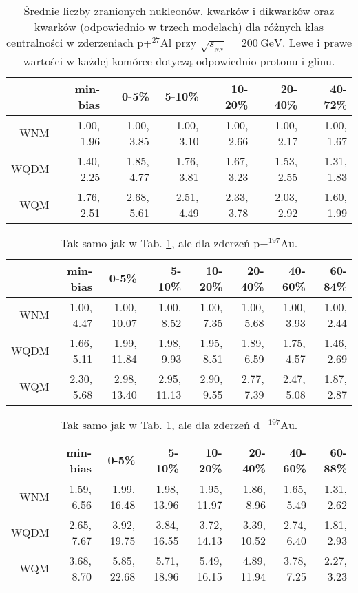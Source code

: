 \documentclass[a4paper,12pt]{article}
\begin{document}
\begin{table}[H]\centering
\begin{tabular}{|r|r|r|r|r|r|r|} \hline
 & min-bias & 0-5\% & 5-10\% & 10-20\% & 20-40\% & 40-72\% \\ \hline
WNM  & 1.00, 1.96 & 1.00, 3.85 & 1.00, 3.10 & 1.00, 2.66 & 1.00, 2.17 & 1.00, 1.67 \\ \hline
WQDM & 1.40, 2.25 & 1.85, 4.77 & 1.76, 3.81 & 1.67, 3.23 & 1.53, 2.55 & 1.31, 1.83 \\ \hline
WQM  & 1.76, 2.51 & 2.68, 5.61 & 2.51, 4.49 & 2.33, 3.78 & 2.03, 2.92 & 1.60, 1.99 \\ \hline
\end{tabular}
\caption{Średnie liczby zranionych nukleonów, kwarków i dikwarków oraz kwarków (odpowiednio w trzech modelach) dla różnych klas centralności w zderzeniach p+$^{27}$Al przy $\sqrt{s_{_{NN}}} = 200~\text{GeV}$. Lewe i prawe wartości w każdej komórce dotyczą odpowiednio protonu i glinu.}\label{table:p-Al}
\end{table}
\begin{table}[H]\centering
\begin{tabular}{|r|r|r|r|r|r|r|r|} \hline
 & min-bias & 0-5\% & 5-10\% & 10-20\% & 20-40\% & 40-60\% & 60-84\% \\ \hline
WNM  & 1.00, 4.47 & 1.00, 10.07 & 1.00, 8.52 & 1.00, 7.35 & 1.00, 5.68 & 1.00, 3.93 & 1.00, 2.44 \\ \hline
WQDM & 1.66, 5.11 & 1.99, 11.84 & 1.98, 9.93 & 1.95, 8.51 & 1.89, 6.59 & 1.75, 4.57 & 1.46, 2.69 \\ \hline
WQM  & 2.30, 5.68 & 2.98, 13.40 & 2.95, 11.13 & 2.90, 9.55 & 2.77, 7.39 & 2.47, 5.08 & 1.87, 2.87 \\ \hline
\end{tabular}
\caption{Tak samo jak w Tab. \ref{table:p-Al}, ale dla zderzeń p+$^{197}$Au.}\label{table:p-Au}
\end{table}
\begin{table}[H]\centering
\begin{tabular}{|r|r|r|r|r|r|r|r|} \hline
 & min-bias & 0-5\% & 5-10\% & 10-20\% & 20-40\% & 40-60\% & 60-88\% \\ \hline
WNM  & 1.59, 6.56 & 1.99, 16.48 & 1.98, 13.96 & 1.95, 11.97 & 1.86, 8.96 & 1.65, 5.49 & 1.31, 2.62 \\ \hline
WQDM & 2.65, 7.67 & 3.92, 19.75 & 3.84, 16.55 & 3.72, 14.13 & 3.39, 10.52 & 2.74, 6.40 & 1.81, 2.93 \\ \hline
WQM  & 3.68, 8.70 & 5.85, 22.68 & 5.71, 18.96 & 5.49, 16.15 & 4.89, 11.94 & 3.78, 7.25 & 2.27, 3.23 \\ \hline
\end{tabular}
\caption{Tak samo jak w Tab. \ref{table:p-Al}, ale dla zderzeń d+$^{197}$Au.}\label{table:d-Au}
\end{table}
\end{document}
